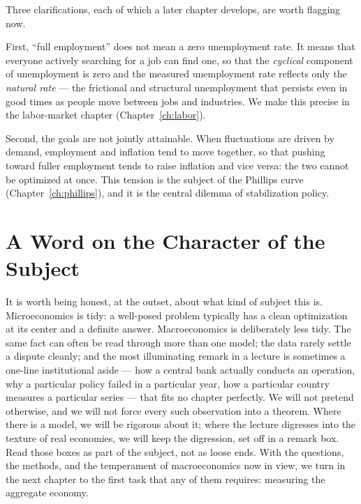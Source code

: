 Three clarifications, each of which a later chapter develops, are worth flagging now.

First, ``full employment'' does not mean a zero unemployment rate. It means that everyone actively searching for a job can find one, so that the \emph{cyclical} component of unemployment is zero and the measured unemployment rate reflects only the \emph{natural rate} --- the frictional and structural unemployment that persists even in good times as people move between jobs and industries. We make this precise in the labor-market chapter (Chapter~\ref{ch:labor}).

Second, the goals are not jointly attainable. When fluctuations are driven by demand, employment and inflation tend to move together, so that pushing toward fuller employment tends to raise inflation and vice versa: the two cannot be optimized at once. This tension is the subject of the Phillips curve (Chapter~\ref{ch:phillips}), and it is the central dilemma of stabilization policy.


\section{A Word on the Character of the Subject}

It is worth being honest, at the outset, about what kind of subject this is. Microeconomics is tidy: a well-posed problem typically has a clean optimization at its center and a definite answer. Macroeconomics is deliberately less tidy. The same fact can often be read through more than one model; the data rarely settle a dispute cleanly; and the most illuminating remark in a lecture is sometimes a one-line institutional aside --- how a central bank actually conducts an operation, why a particular policy failed in a particular year, how a particular country measures a particular series --- that fits no chapter perfectly. We will not pretend otherwise, and we will not force every such observation into a theorem. Where there is a model, we will be rigorous about it; where the lecture digresses into the texture of real economies, we will keep the digression, set off in a remark box. Read those boxes as part of the subject, not as loose ends. With the questions, the methods, and the temperament of macroeconomics now in view, we turn in the next chapter to the first task that any of them requires: measuring the aggregate economy.

